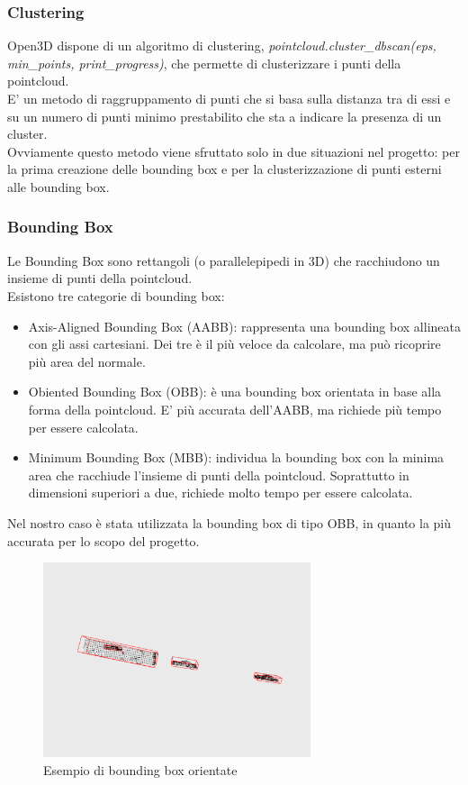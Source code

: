 \documentclass[italian]{article}
\begin{document}
\subsubsection{Clustering}
Open3D dispone di un algoritmo di clustering, \textit{pointcloud.cluster\_dbscan(eps, min\_points, print\_progress)}, che permette di clusterizzare i punti della pointcloud.\\
E' un metodo di raggruppamento di punti che si basa sulla distanza tra di essi e su un numero di punti minimo prestabilito che sta a indicare la presenza di un cluster.\\
Ovviamente questo metodo viene sfruttato solo in due situazioni nel progetto: per la prima creazione delle bounding box e per la clusterizzazione di punti esterni alle bounding box.
\subsubsection{Bounding Box}
Le Bounding Box sono rettangoli (o parallelepipedi in 3D) che racchiudono un insieme di punti della pointcloud.\\
Esistono tre categorie di bounding box:
\begin{itemize}
	\item Axis-Aligned Bounding Box (AABB): rappresenta una bounding box allineata con gli assi cartesiani. Dei tre è il più veloce da calcolare, ma può ricoprire più area del normale.
	\item Obiented Bounding Box (OBB): è una bounding box orientata in base alla forma della pointcloud. E' più accurata dell'AABB, ma richiede più tempo per essere calcolata.
	\item Minimum Bounding Box (MBB): individua la bounding box con la minima area che racchiude l'insieme di punti della pointcloud. Soprattutto in dimensioni superiori a due, richiede molto tempo per essere calcolata.
\end{itemize}
Nel nostro caso è stata utilizzata la bounding box di tipo OBB, in quanto la più accurata per lo scopo del progetto.
\begin{figure}[H]
	\centering
	\includegraphics[width=0.7\textwidth]{bbox}
	\footnotesize
	\caption{Esempio di bounding box orientate}
\end{figure}\\
\end{document}
